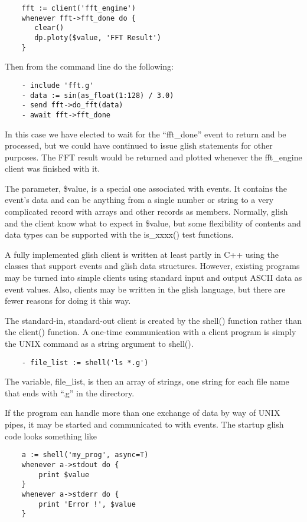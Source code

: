 \begin{verbatim}
	fft := client('fft_engine')
	whenever fft->fft_done do {
	   clear()
	   dp.ploty($value, 'FFT Result')
	}
\end{verbatim}

Then from the command line do the following:

\begin{verbatim}
	- include 'fft.g'
	- data := sin(as_float(1:128) / 3.0)
	- send fft->do_fft(data)
	- await fft->fft_done
\end{verbatim}

    In this case we have elected to wait for the ``fft\_done'' event to return
and be processed, but we could have continued to issue glish statements for
other purposes.  The FFT result would be returned and plotted whenever the
fft\_engine client was finished with it.

    The parameter, \$value, is a special one associated with events.  It
contains the event's data and can be anything from a single number or
string to a very complicated record with arrays and other records as
members.  Normally, glish and the client know what to expect in \$value, but
some flexibility of contents and data types can be supported with the
is\_xxxx() test functions.

    A fully implemented glish client is written at least partly in C++
using the classes that support events and glish data structures.  However,
existing programs may be turned into simple clients using standard input
and output ASCII data as event values.  Also, clients may be written in the
glish language, but there are fewer reasons for doing it this way.

    The standard-in, standard-out client is created by the shell() function
rather than the client() function.  A one-time communication with a client
program is simply the UNIX command as a string argument to shell().

\begin{verbatim}
	- file_list := shell('ls *.g')
\end{verbatim}

The variable, file\_list, is then an array of strings, one string for each
file name that ends with ``.g'' in the directory.

    If the program can handle more than one exchange of data by way of UNIX
pipes, it may be started and communicated to with events.  The startup
glish code looks something like

\begin{verbatim}
	a := shell('my_prog', async=T)
	whenever a->stdout do {
	    print $value
	}
	whenever a->stderr do {
	    print 'Error !', $value
	}
\end{verbatim}

